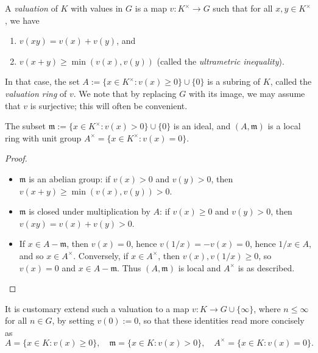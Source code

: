 \documentclass[reqno]{amsart}
\begin{document}
A \emph{valuation} of \(K\) with values in \(G\) is a map
\(v : K^\times \rightarrow G\)
such that for all \(x,y \in K^\times\),
we have
\begin{enumerate}
\item $v(x y) = v(x) + v(y)$, and
\item $v(x + y) \geq \min(v(x), v(y))$ (called the \emph{ultrametric inequality}).
\end{enumerate}
In that case, the set \(A := \{x \in K^\times : v(x) \geq 0\} \cup
  \{0\}\) is a subring
of \(K\), called the \emph{valuation ring} of \(v\).
We note that by replacing \(G\) with its image, we may assume that
\(v\) is surjective; this will often be convenient.
\begin{lemma}
  The subset $\mathfrak{m} := \{x \in K^\times : v(x) > 0\} \cup
  \{0\}$
  is an ideal, and $(A,\mathfrak{m})$ is a local ring
  with unit group $A^\times = \{x \in K^\times : v(x) = 0\}$.
\end{lemma}
\begin{proof}~
  \begin{itemize}
  \item $\mathfrak{m}$ is an abelian group:
    if $v(x) > 0$ and $v(y) > 0$, then
    $v(x+y) \geq \min(v(x),v(y)) > 0$.
  \item $\mathfrak{m}$ is closed under multiplication by $A$:
    if $v(x) \geq 0$ and $v(y) > 0$,
    then
    $v(x y) = v(x) + v(y) > 0$.
  \item 
    If $x \in A - \mathfrak{m}$,
    then $v(x) = 0$,
    hence $v(1/x) = -v(x) = 0$,
    hence $1/x \in A$,
    and so $x \in A^\times$.
    Conversely,
    if $x \in A^\times$,
    then $v(x), v(1/x) \geq 0$,
    so $v(x) = 0$ and $x \in A - \mathfrak{m}$.
    Thus $(A,\mathfrak{m})$ is local
    and $A^\times$ is as described.
  \end{itemize}
\end{proof}
It is customary
extend such a valuation
to a map \(v : K \rightarrow G \cup \{\infty \}\),
where \(n \leq \infty\) for all \(n \in G\),
by setting \(v(0) := 0\),
so that these identities read more concisely
as
\[
    A = \{x \in K : v(x) \geq 0\},
    \quad
    \mathfrak{m} = \{x \in K : v(x) > 0\},
    \quad
    A^\times  = \{x \in K : v(x) = 0\}.
  \]
\end{document}
